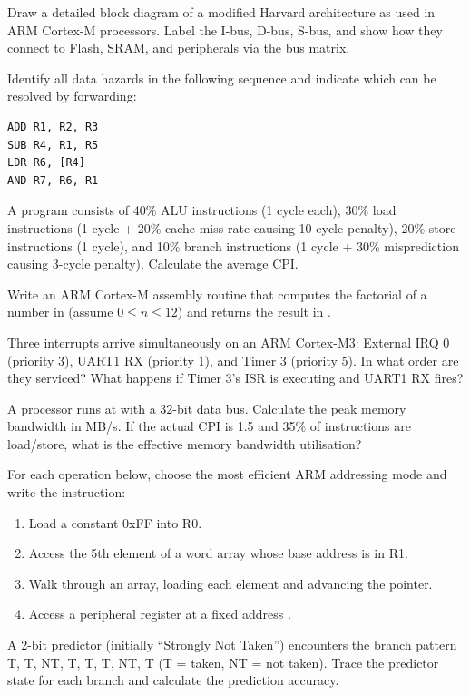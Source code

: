 \begin{exercise}
Draw a detailed block diagram of a modified Harvard architecture as used in ARM Cortex-M processors. Label the I-bus, D-bus, S-bus, and show how they connect to Flash, SRAM, and peripherals via the bus matrix.
\end{exercise}

\begin{exercise}
Identify all data hazards in the following sequence and indicate which can be resolved by forwarding:
\begin{lstlisting}[style=ARM, numbers=none]
ADD R1, R2, R3
SUB R4, R1, R5
LDR R6, [R4]
AND R7, R6, R1
\end{lstlisting}
\end{exercise}

\begin{exercise}
A program consists of 40\% ALU instructions (1 cycle each), 30\% load instructions (1 cycle + 20\% cache miss rate causing 10-cycle penalty), 20\% store instructions (1 cycle), and 10\% branch instructions (1 cycle + 30\% misprediction causing 3-cycle penalty). Calculate the average CPI.
\end{exercise}

\begin{exercise}
Write an ARM Cortex-M assembly routine that computes the factorial of a number in  (assume $0 \leq n \leq 12$) and returns the result in .
\end{exercise}

\begin{exercise}
Three interrupts arrive simultaneously on an ARM Cortex-M3: External IRQ 0 (priority 3), UART1 RX (priority 1), and Timer 3 (priority 5). In what order are they serviced? What happens if Timer 3's ISR is executing and UART1 RX fires?
\end{exercise}

\begin{exercise}
A processor runs at  with a 32-bit data bus. Calculate the peak memory bandwidth in MB/s. If the actual CPI is 1.5 and 35\% of instructions are load/store, what is the effective memory bandwidth utilisation?
\end{exercise}

\begin{exercise}
For each operation below, choose the most efficient ARM addressing mode and write the instruction:
\begin{enumerate}[label=(\alph*)]
  \item Load a constant 0xFF into R0.
  \item Access the 5th element of a word array whose base address is in R1.
  \item Walk through an array, loading each element and advancing the pointer.
  \item Access a peripheral register at a fixed address .
\end{enumerate}
\end{exercise}

\begin{exercise}
A 2-bit predictor (initially ``Strongly Not Taken'') encounters the branch pattern T, T, NT, T, T, T, NT, T (T = taken, NT = not taken). Trace the predictor state for each branch and calculate the prediction accuracy.
\end{exercise}
